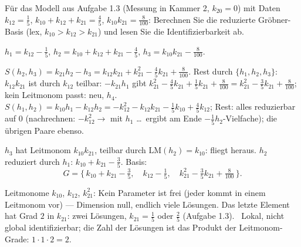 \begin{aufgabe}
Für das Modell aus Aufgabe 1.3 (Messung in Kammer 2, $k_{20} = 0$) mit Daten $k_{12} = \tfrac15$, $k_{10} + k_{12} + k_{21} = \tfrac45$, $k_{10}k_{21} = \tfrac{8}{100}$: Berechnen Sie die reduzierte Gröbner-Basis (lex, $k_{10} > k_{12} > k_{21}$) und lesen Sie die Identifizierbarkeit ab.

\loesung
{}
$h_1 = k_{12} - \tfrac15$, $h_2 = k_{10} + k_{12} + k_{21} - \tfrac45$, $h_3 = k_{10}k_{21} - \tfrac{8}{100}$.

$S(h_2, h_3) = k_{21}h_2 - h_3 = k_{12}k_{21} + k_{21}^{2} - \tfrac45k_{21} + \tfrac{8}{100}$. Rest durch $\{h_1, h_2, h_3\}$: $k_{12}k_{21}$ ist durch $k_{12}$ teilbar: $- k_{21}h_1$ gibt $k_{21}^{2} - \tfrac45k_{21} + \tfrac15k_{21} + \tfrac{8}{100} = k_{21}^{2} - \tfrac35k_{21} + \tfrac{8}{100}$; kein Leitmonom passt: neu, $h_4$. $S(h_1, h_2) = k_{10}h_1 - k_{12}h_2 = -k_{12}^{2} - k_{12}k_{21} - \tfrac15k_{10} + \tfrac45k_{12}$; Rest: alles reduzierbar auf $0$ (nachrechnen: $-k_{12}^{2}\to$ mit $h_1$ \ldots\ ergibt am Ende $-\tfrac15h_2$-Vielfache); die übrigen Paare ebenso.

$h_3$ hat Leitmonom $k_{10}k_{21}$, teilbar durch $\mathrm{LM}(h_2) = k_{10}$: fliegt heraus. $h_2$ reduziert durch $h_1$: $k_{10} + k_{21} - \tfrac35$. Basis:
\[ G = \bigl\{\,k_{10} + k_{21} - \tfrac35,\quad k_{12} - \tfrac15,\quad k_{21}^{2} - \tfrac35k_{21} + \tfrac{8}{100}\,\bigr\} . \]

Leitmonome $k_{10}$, $k_{12}$, $k_{21}^{2}$: Kein Parameter ist frei (jeder kommt in einem Leitmonom vor) --- Dimension null, endlich viele Lösungen. Das letzte Element hat Grad $2$ in $k_{21}$: zwei Lösungen, $k_{21} = \tfrac15$ oder $\tfrac25$ (Aufgabe 1.3). \checkmark\ Lokal, nicht global identifizierbar; die Zahl der Lösungen ist das Produkt der Leitmonom-Grade: $1\cdot1\cdot2 = 2$.

\begin{center}
\begin{minipage}{0.88\textwidth}
\end{minipage}
\end{center}
\end{aufgabe}

